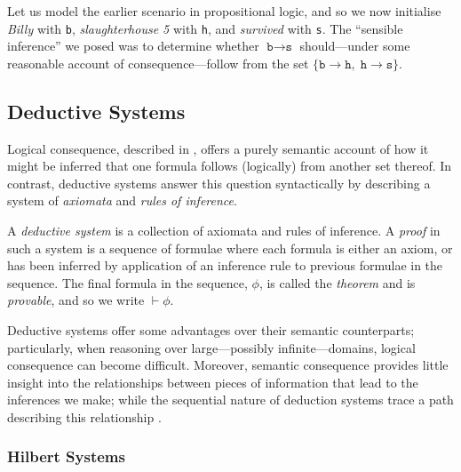 \begin{example}
     \label{example-logical-consequence}   
Let us model the earlier scenario in propositional logic, and so we now initialise \textit{Billy} with \texttt{b}, \textit{slaughterhouse 5} with \texttt{h}, and \textit{survived} with \texttt{s}. The ``sensible inference'' we posed was to determine whether $\texttt{b} \rightarrow \texttt{s}$ should---under some reasonable account of consequence---follow from the set $\{\texttt{b} \rightarrow \texttt{h},\; \texttt{h} \rightarrow \texttt{s}\}$. 
\end{example}


\subsection{Deductive Systems}
\label{subsection:deduction-systems}
  
Logical consequence, described in , offers a purely semantic account of how it might be inferred that one formula follows (logically) from another set thereof. In contrast, deductive systems answer this question syntactically by describing a system of \textit{axiomata} and \textit{rules of inference}. 

\begin{definition}
     \label{definition:deductive-system} 
     A \textit{deductive system} is a collection of axiomata and rules of inference. A \textit{proof} in such a system is a sequence of formulae where each formula is either an axiom, or has been inferred by application of an inference rule to previous formulae in the sequence. The final formula in the sequence, $\phi$, is called the \textit{theorem} and is \textit{provable}, and so we write $\vdash \phi$. 
\end{definition}

Deductive systems offer some advantages over their semantic counterparts; particularly, when reasoning over large---possibly infinite---domains, logical consequence can become difficult. Moreover, semantic consequence provides little insight into the relationships between pieces of information that lead to the inferences we make; while the sequential nature of deduction systems trace a path describing this relationship \cite[p. 55]{Ben1993Mathematical}.

\subsubsection{Hilbert Systems} 
\label{subsubsection:hilbert-systems}

